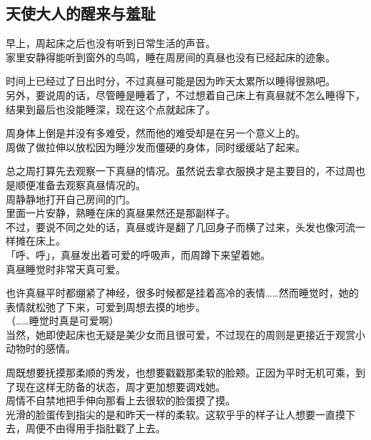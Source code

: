\subsection{天使大人的醒来与羞耻}

早上，周起床之后也没有听到日常生活的声音。\\

家里安静得能听到窗外的鸟鸣，睡在周房间的真昼也没有已经起床的迹象。

时间上已经过了日出时分，不过真昼可能是因为昨天太累所以睡得很熟吧。\\

另外，要说周的话，尽管睡是睡着了，不过想着自己床上有真昼就不怎么睡得下，结果到最后也没能睡深，现在这个点就起床了。

周身体上倒是并没有多难受，然而他的难受却是在另一个意义上的。\\

周做了做拉伸以放松因为睡沙发而僵硬的身体，同时缓缓站了起来。

总之周打算先去观察一下真昼的情况。虽然说去拿衣服换才是主要目的，不过周也是顺便准备去观察真昼情况的。\\

周静静地打开自己房间的门。\\

里面一片安静，熟睡在床的真昼果然还是那副样子。\\

不过，要说不同之处的话，真昼或许是翻了几回身子而横了过来，头发也像河流一样摊在床上。\\

「呼、呼」，真昼发出着可爱的呼吸声，而周蹲下来望着她。\\

真昼睡觉时非常天真可爱。

也许真昼平时都绷紧了神经，很多时候都是挂着高冷的表情……然而睡觉时，她的表情就松弛了下来，可爱到周想去摸的地步。\\

（……睡觉时真是可爱啊）\\

当然，她即使起床也无疑是美少女而且很可爱，不过现在的周则是更接近于观赏小动物时的感情。

周既想要抚摸那柔顺的秀发，也想要戳戳那柔软的脸颊。正因为平时无机可乘，到了现在这样无防备的状态，周才更加想要调戏她。\\

周情不自禁地把手伸向那看上去很软的脸蛋摸了摸。\\

光滑的脸蛋传到指尖的是和昨天一样的柔软。这软乎乎的样子让人想要一直摸下去，周便不由得用手指肚戳了上去。\\


